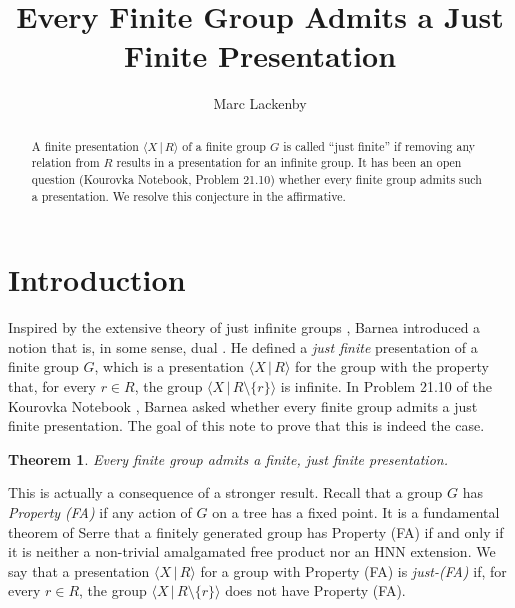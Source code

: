 \documentclass[11pt,oneside]{amsart}
\title{Every Finite Group Admits a Just Finite Presentation}
\author{Marc Lackenby}
\newtheorem{theorem}{Theorem}
\begin{document}
\maketitle

\begin{abstract}
A finite presentation $\langle X \, | \, R \rangle$ of a finite group $G$ is called ``just finite'' if removing any relation from $R$ results in a presentation for an infinite group. It has been an open question (Kourovka Notebook, Problem 21.10) whether every finite group admits such a presentation. We resolve this conjecture in the affirmative. 
\end{abstract}

\section{Introduction}
Inspired by the extensive theory of just infinite groups \cite{McCarthy1, McCarthy2, Wilson, Wilson2000, Grigorchuk2000, Reid:Structure, Reid2010}, Barnea introduced a notion that is, in some sense, dual \cite{Barnea}. He defined a \emph{just finite} presentation of a finite group $G$, which is a presentation $\langle X \, | \, R \rangle$ for the group with the property that, for every $r \in R$, the group $\langle X \, | \, R \setminus \{r\} \rangle$ is infinite. In  Problem 21.10 of the Kourovka Notebook \cite{Kourovka}, Barnea asked whether every finite group admits a just finite presentation. The goal of this note to prove that this is indeed the case.

\begin{theorem}
\label{Thm:Main}
Every finite group admits a finite, just finite presentation.
\end{theorem}

This is actually a consequence of a stronger result.
Recall that a group $G$ has \emph{Property (FA)} if any action of $G$ on a tree has a fixed point. It is a fundamental theorem of Serre \cite{Serre} that a finitely generated group has
Property (FA) if and only if it is neither a non-trivial amalgamated free product nor an HNN extension. We say that a presentation $\langle X \, | \, R \rangle$ for a group with Property (FA) is \emph{just-(FA)} if, for every $r \in R$, the group $\langle X \, | \, R \setminus \{r\} \rangle$ does not have Property (FA).
\end{document}
